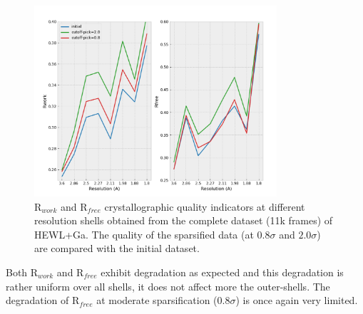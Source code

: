 \documentclass[preprint]{iucr}              %
\begin{document}
\begin{figure}
\label{nicolas_R}
\begin{center}
\includegraphics[width=9cm]{nicolas5.2}
\caption{R$_{work}$ and R$_{free}$ crystallographic quality indicators at different resolution shells obtained from the complete dataset (11k frames) of HEWL+Ga. The quality of the sparsified data (at $0.8\sigma$ and $2.0\sigma$) are compared with the initial dataset.}
\end{center}
\end{figure}

Both R$_{work}$ and R$_{free}$ exhibit degradation as expected and this degradation is rather uniform over all shells, it does not affect more the outer-shells.%
The degradation of R$_{free}$ at moderate sparsification ($0.8 \sigma$) is once again very limited.
\end{document}

